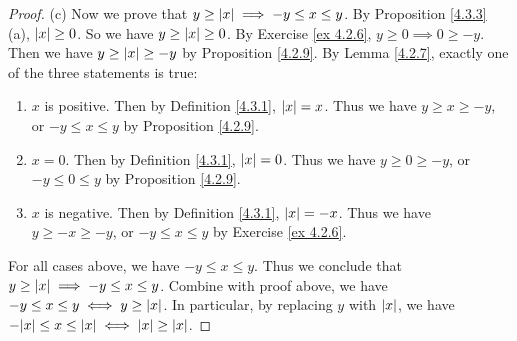 \begin{proof}{(c)}
Now we prove that \(y \geq \abs*{x} \implies -y \leq x \leq y\).
By Proposition \ref{4.3.3} (a), \(\abs*{x} \geq 0\).
So we have \(y \geq \abs*{x} \geq 0\).
By Exercise \ref{ex 4.2.6}, \(y \geq 0 \implies 0 \geq -y\).
Then we have \(y \geq \abs*{x} \geq -y\) by Proposition \ref{4.2.9}.
By Lemma \ref{4.2.7}, exactly one of the three statements is true:
\begin{enumerate}
    \item \(x\) is positive.
    Then by Definition \ref{4.3.1}, \(\abs*{x} = x\).
    Thus we have \(y \geq x \geq -y\), or \(-y \leq x \leq y\) by Proposition \ref{4.2.9}.
    \item \(x = 0\).
    Then by Definition \ref{4.3.1}, \(\abs*{x} = 0\).
    Thus we have \(y \geq 0 \geq -y\), or \(-y \leq 0 \leq y\) by Proposition \ref{4.2.9}.
    \item \(x\) is negative.
    Then by Definition \ref{4.3.1}, \(\abs*{x} = -x\).
    Thus we have \(y \geq -x \geq -y\), or \(-y \leq x \leq y\) by Exercise \ref{ex 4.2.6}.
\end{enumerate}
For all cases above, we have \(-y \leq x \leq y\).
Thus we conclude that \(y \geq \abs*{x} \implies -y \leq x \leq y\).
Combine with proof above, we have \(-y \leq x \leq y \iff y \geq \abs*{x}\).
In particular, by replacing \(y\) with \(\abs*{x}\), we have \(-\abs*{x} \leq x \leq \abs*{x} \iff \abs*{x} \geq \abs*{x}\).
\end{proof}

